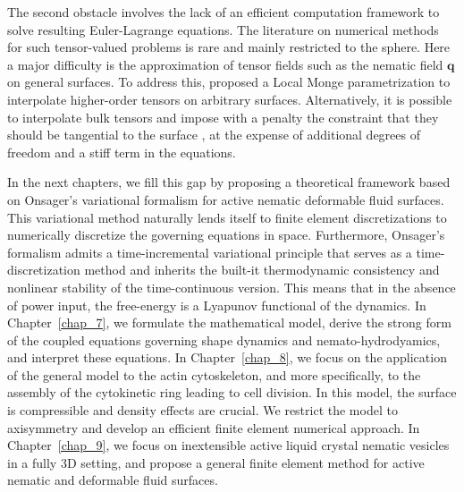 The second obstacle involves the lack of an efficient computation framework to solve resulting Euler-Lagrange equations. The literature on numerical methods for such tensor-valued problems is rare and mainly restricted to the sphere. Here a major difficulty is the approximation of tensor fields such as the nematic field $\bm{q}$ on general surfaces. To address this, \citet{torres2020} proposed a Local Monge parametrization to interpolate  higher-order tensors on arbitrary surfaces. Alternatively, it is possible to interpolate bulk tensors and impose with a penalty the constraint that they should be tangential to the surface \cite{nestler2018,metselaar2019,https://doi.org/10.48550/arxiv.2205.06805}, at the expense of additional degrees of freedom and a stiff term in the equations. 


In the next chapters, we fill this gap by proposing a theoretical framework based on Onsager's variational formalism for active nematic deformable fluid surfaces. This variational method naturally lends itself to finite element discretizations to numerically discretize  the governing equations in space. Furthermore, Onsager's formalism admits a time-incremental variational principle that serves as a time-discretization method and inherits the built-it thermodynamic consistency and nonlinear stability of the time-continuous version. This means that in the absence of power input, the free-energy is a Lyapunov functional of the dynamics. In Chapter~\ref{chap_7}, we formulate the mathematical model, derive the strong form of the coupled equations governing shape dynamics and nemato-hydrodyamics, and interpret these equations. In Chapter~\ref{chap_8}, we focus on the application of the general model to the actin cytoskeleton, and more specifically, to the assembly of the cytokinetic ring leading to cell division. In this model, the surface is compressible and density effects are crucial. We restrict the model to axisymmetry and develop an efficient finite element numerical approach. In Chapter~\ref{chap_9}, we focus on inextensible active liquid crystal nematic vesicles in a fully 3D setting, and propose a general finite element method for active nematic and deformable fluid surfaces. 

